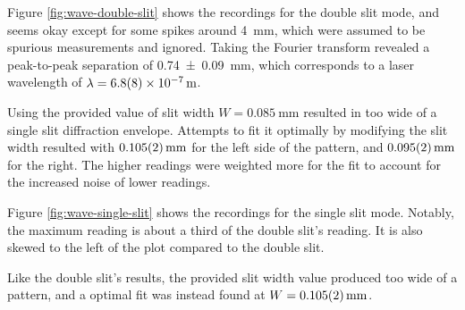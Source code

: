 \documentclass[a4paper]{scrartcl}
\begin{document}
Figure \ref{fig:wave-double-slit} shows the recordings for the double slit mode, and seems okay except for some spikes around \SI{4}{\milli\metre}, which were assumed to be spurious measurements and ignored. Taking the Fourier transform revealed a peak-to-peak separation of \SI{0.74 \pm 0.09}{\milli\metre}, which corresponds to a laser wavelength of \(\lambda = \SI{6.8 \pm 0.8 e-7}{\metre}\).

Using the provided value of slit width \(W = \SI{0.085}{\milli\metre}\) resulted in too wide of a single slit diffraction envelope. Attempts to fit it optimally by modifying the slit width resulted with \(\SI{0.105 \pm 0.002}{\milli\metre}\) for the left side of the pattern, and \(\SI{0.095 \pm 0.002}{\milli\metre}\) for the right. The higher readings were weighted more for the fit to account for the increased noise of lower readings.

Figure \ref{fig:wave-single-slit} shows the recordings for the single slit mode. Notably, the maximum reading is about a third of the double slit's reading. It is also skewed to the left of the plot compared to the double slit.

Like the double slit's results, the provided slit width value produced too wide of a pattern, and a optimal fit was instead found at \(W = \SI{0.105 \pm 0.002}{\milli\metre}\).
\end{document}
